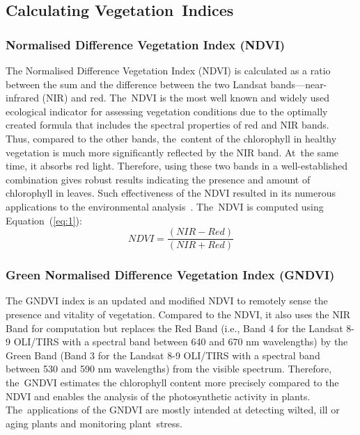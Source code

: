 \documentclass[jimaging,article,accept,pdftex,moreauthors]{Definitions/mdpi}
\begin{document}
\subsection{Calculating Vegetation~Indices}\label{sect2.3}

\subsubsection{Normalised Difference Vegetation Index (NDVI)}
The Normalised Difference Vegetation Index (NDVI) \cite{Rouse} is calculated as a ratio between the sum and the difference between the two Landsat bands---near-infrared (NIR) and red. The~NDVI is the most well known and widely used ecological indicator for assessing vegetation conditions due to the optimally created formula that includes the spectral properties of red and NIR bands. Thus, compared to the other bands, the~content of the chlorophyll in healthy vegetation is much more significantly reflected by the NIR band. At~the same time, it absorbs red light. Therefore, using these two bands in a well-established combination gives robust results indicating the presence and amount of chlorophyll in leaves. Such effectiveness of the NDVI resulted in its numerous applications to the environmental analysis~\cite{w13192707,rs12244119,GHEBREZGABHER2020249,RULINDA2012169}. The~NDVI is computed using Equation~(\ref{eq:1}):
\begin{equation}\label{eq:1}
NDVI=\dfrac{(NIR-Red)}{(NIR+Red)}
\end{equation}


\subsubsection{Green Normalised Difference Vegetation Index (GNDVI)}

The GNDVI index is an updated and modified NDVI to remotely sense the presence and vitality of vegetation. Compared to the NDVI, it also uses the NIR Band for computation but replaces the Red Band (i.e., Band 4 for the Landsat 8-9 OLI/TIRS with a spectral band between 640 and 670 nm wavelengths) by the Green Band (Band 3 for the Landsat 8-9 OLI/TIRS with a spectral band between 530 and 590 nm wavelengths) from the visible spectrum. Therefore, the~GNDVI estimates the chlorophyll content more precisely compared to the NDVI and enables the analysis of the photosynthetic activity in plants. The~applications of the GNDVI are mostly intended at detecting wilted, ill or aging plants and monitoring plant~stress. 
\end{document}
